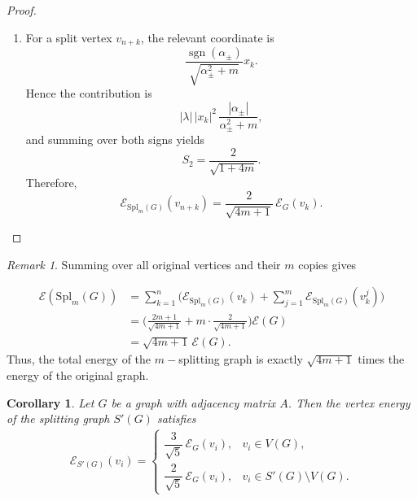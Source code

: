 \documentclass[12pt]{article}
\theoremstyle{plain}
\newtheorem*{corollary}{Corollary}
\theoremstyle{remark}
\newtheorem*{remark}{Remark}
\theoremstyle{definition}
\begin{document}
\begin{proof}
\begin{enumerate}
		Therefore,
		$$\mathcal{E}_{\mathrm{Spl}_m(G)}(v_k)
		=\sum_{\lambda,x}|\lambda|\,|x_k|^2\,S_1
		=\frac{2m+1}{\sqrt{4m+1}}\,\mathcal{E}_G(v_k).$$
		\item  	For a split vertex $v_{n+k}$, the relevant coordinate is $$\dfrac{\operatorname{sgn}(\alpha_\pm)}{\sqrt{\alpha_\pm^2+m}}x_k.$$ Hence the contribution is
		$$|\lambda|\,|x_k|^2\,\frac{|\alpha_\pm|}{\alpha_\pm^2+m},$$
		and summing over both signs yields $$S_2=\dfrac{2}{\sqrt{1+4m}}.$$ Therefore,
		$$\mathcal{E}_{\mathrm{Spl}_m(G)}(v_{n+k})
		=\frac{2}{\sqrt{4m+1}}\,\mathcal{E}_G(v_k).$$
		
	\end{enumerate}
	
\end{proof}

\begin{remark}
	Summing over all original vertices and their $m$ copies gives
	
	\begin{align*}
		\mathcal{E}(\mathrm{Spl}_m(G))
		&=\sum_{k=1}^n\Big(\mathcal{E}_{\mathrm{Spl}_m(G)}(v_k)+\sum_{j=1}^m\mathcal{E}_{\mathrm{Spl}_m(G)}(v_k^j)\Big)
		\\&=\Big(\frac{2m+1}{\sqrt{4m+1}}+m\cdot\frac{2}{\sqrt{4m+1}}\Big)\mathcal{E}(G)\\&
		=\sqrt{4m+1}\,\mathcal{E}(G).
	\end{align*}
	Thus, the total energy of the $m-$splitting graph is exactly $\sqrt{4m+1}$ times the energy of the original graph.
\end{remark}
\begin{corollary}
	Let $G$ be a graph with adjacency matrix $A$. Then the vertex energy of the splitting graph $S'(G)$ satisfies \begin{align*}
		\mathcal{E}_{S'(G)}(v_i)=
		\begin{cases}
			\dfrac{3}{\sqrt{5}}\,\mathcal{E}_G(v_i), & v_i\in V(G),\\[8pt]
			\dfrac{2}{\sqrt{5}}\,\mathcal{E}_G(v_i), & v_i\in S'(G)\setminus V(G).
		\end{cases}
	\end{align*}
\end{corollary}
\end{document}
